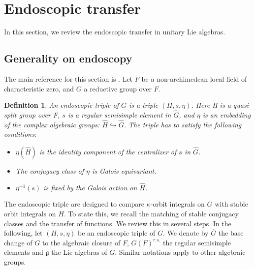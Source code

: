\documentclass[11pt, oneside,reqno]{amsart}   	%
\newtheorem{definition}[theorem]{Definition}
\begin{document}
 \section{Endoscopic transfer} \label{LS review}

In this section, we review the endoscopic transfer in unitary Lie algebras.

\subsection{Generality on endoscopy} \label{gen}

The main reference for this section is \cite{Kazhdan}. Let $F$ be a non-archimedean local field of characteristic zero, and $G$ a reductive group over $F$. 

\begin{definition}
An endoscopic triple of $G$ is a triple $(H,s,\eta)$. Here H is a quasi-split group over F, $s$ is a regular semisimple element in $\widehat{G}$, and $\eta$ is an embedding of the complex algebraic groups: $\widehat{H} \hookrightarrow \widehat{G}$. The triple has to satisfy the following conditions$:$
\begin{itemize}
  \item $\eta(\widehat{H})$ is the identity component of the centralizer of $s$ in $\widehat{G}$.
  \item The conjugacy class of $\eta$ is Galois equivariant.
  \item $\eta^{-1}(s)$ is fixed by the Galois action on $\widehat{H}$.
\end{itemize}
\end{definition}

The endoscopic triple are designed to compare $\kappa$-orbit integrals on $G$ with stable orbit integrals on $H$. To state this, we recall the matching of stable conjugacy classes and the transfer of functions. We review this in several steps. In the following, let $(H,s,\eta)$ be an endoscopic triple of $G$. We denote by $\overline{G}$ the base change of $G$ to the algebraic closure of $F$, $G(F)^{r.s.}$ the regular semisimple elements and $\mathfrak{g}$ the Lie algebras of $G$. Similar notations apply to other algebraic groups.
\end{document}
